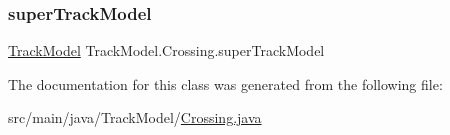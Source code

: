 \mbox{\label{classTrackModel_1_1Crossing_af353edaf8c1d5f5cad24ffc45f3370e4}} 
\subsubsection{\texorpdfstring{super\+Track\+Model}{superTrackModel}}
{\footnotesize\ttfamily \hyperlink{classTrackModel_1_1TrackModel}{Track\+Model} Track\+Model.\+Crossing.\+super\+Track\+Model}



The documentation for this class was generated from the following file\+:\begin{DoxyCompactItemize}
\item 
src/main/java/\+Track\+Model/\hyperlink{Crossing_8java}{Crossing.\+java}\end{DoxyCompactItemize}
